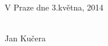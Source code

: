 \vspace{1.5cm}

\noindent
\begin{minipage}[b]{5cm}
V Praze dne 3.kv\v{e}tna, 2014
\end{minipage}
\hfill
\begin{minipage}[t]{5cm}
\begin{center}
\dotfill\\
Jan Kučera
\end{center}
\end{minipage}

\vspace*{2cm}


\newpage

\thispagestyle{empty}

